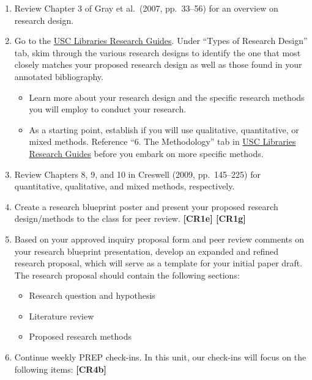 \documentclass[11pt,]{article}
\providecommand{\tightlist}{%
  \setlength{\itemsep}{0pt}\setlength{\parskip}{0pt}}
\begin{document}
\begin{enumerate}
\def\labelenumi{\arabic{enumi}.}
\item
  Review Chapter 3 of Gray et al.~(2007, pp.~33--56) for an overview on research design.
\item
  Go to the \href{https://libguides.usc.edu/writingguide/researchdesigns}{USC Libraries Research Guides}. Under ``Types of Research Design'' tab, skim through the various research designs to identify the one that most closely matches your proposed research design as well as those found in your annotated bibliography.

  \begin{itemize}
  \tightlist
  \item
    Learn more about your research design and the specific research methods you will employ to conduct your research.
  \item
    As a starting point, establish if you will use qualitative, quantitative, or mixed methods. Reference ``6. The Methodology'' tab in \href{https://libguides.usc.edu/writingguide/researchdesigns}{USC Libraries Research Guides} before you embark on more specific methods.
  \end{itemize}
\item
  Review Chapters 8, 9, and 10 in Creswell (2009, pp.~145--225) for quantitative, qualitative, and mixed methods, respectively.
\item
  Create a research blueprint poster and present your proposed research design/methods to the class for peer review. \textbf{{[}CR1e{]} {[}CR1g{]}}  
\item
  Based on your approved inquiry proposal form and peer review comments on your research blueprint presentation, develop an expanded and refined research proposal, which will serve as a template for your initial paper draft. The research proposal should contain the following sections:

  \begin{itemize}
  \tightlist
  \item
    Research question and hypothesis
  \item
    Literature review
  \item
    Proposed research methods
  \end{itemize}
\item
  Continue weekly PREP check-ins. In this unit, our check-ins will focus on the following items: \textbf{{[}CR4b{]}} 


\end{enumerate}
\end{document}
